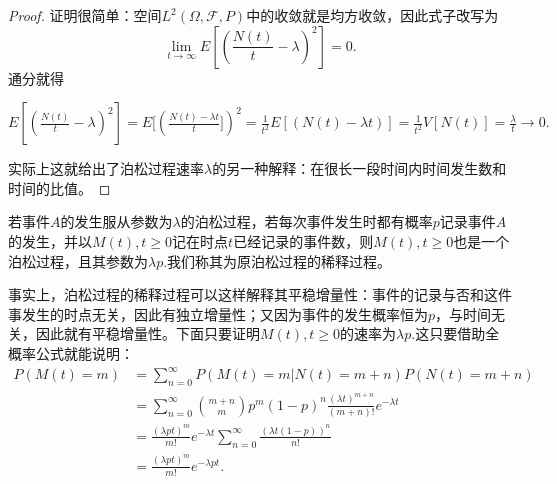 \documentclass[lang=cn,10pt]{elegantbook}
\begin{document}
	\begin{proof}
		证明很简单：空间\(L^2(\Omega,\mathcal{F},P)\)中的收敛就是均方收敛，因此式子改写为
		\[\lim_{t \to \infty}E[(\frac{N(t)}{t}-\lambda)^2]=0.\]
		通分就得

		\(E[(\frac{N(t)}{t}-\lambda)^2]=E[(\frac{N(t)-\lambda t}{t}])^2=\frac{1}{t^2}E[(N(t)-\lambda t)]=\frac{1}{t^2}V[N(t)]=\frac{\lambda}{t}\to 0.\)

		实际上这就给出了泊松过程速率\(\lambda\)的另一种解释：在很长一段时间内时间发生数和时间的比值。
	\end{proof}


	若事件\(A\)的发生服从参数为\(\lambda\)的泊松过程，若每次事件发生时都有概率\(p\)记录事件\(A\)的发生，并以\(M(t),t\ge 0\)记在时点\(t\)已经记录的事件数，则\(M(t),t\ge 0\)也是一个泊松过程，且其参数为\(\lambda p\).我们称其为原泊松过程的稀释过程。

	事实上，泊松过程的稀释过程可以这样解释其平稳增量性：事件的记录与否和这件事发生的时点无关，因此有独立增量性；又因为事件的发生概率恒为\(p\)，与时间无关，因此就有平稳增量性。下面只要证明\(M(t),t\ge 0\)的速率为\(\lambda p\).这只要借助全概率公式就能说明：
	\begin{align*}
		P(M(t)=m)&=\sum_{n=0}^{\infty}P(M(t)=m|N(t)=m+n)P(N(t)=m+n)\\
		&=\sum_{n=0}^{\infty}\binom{m+n}{m}p^m(1-p)^n\frac{(\lambda t)^{m+n}}{(m+n)!}e^{-\lambda t}\\
		&=\frac{(\lambda pt)^m}{m!}e^{-\lambda t}\sum_{n=0}^{\infty}\frac{(\lambda t(1-p))^n}{n!}\\
		&=\frac{(\lambda pt)^m}{m!}e^{-\lambda pt}.
	\end{align*}
\end{document}

